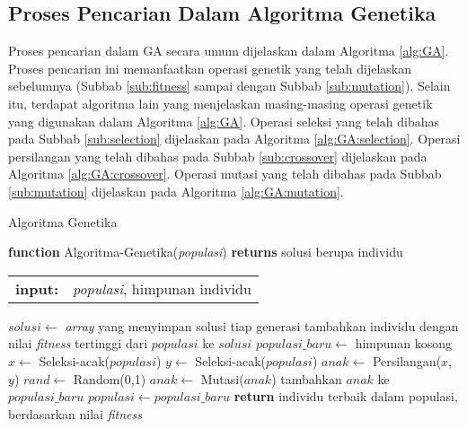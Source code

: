 \subsection{Proses Pencarian Dalam Algoritma Genetika}
Proses pencarian dalam GA secara umum dijelaskan dalam Algoritma \ref{alg:GA}. Proses pencarian ini memanfaatkan operasi genetik yang telah dijelaskan sebelumnya (Subbab \ref{sub:fitness} sampai dengan Subbab \ref{sub:mutation}). Selain itu, terdapat algoritma lain yang menjelaskan masing-masing operasi genetik yang digunakan dalam Algoritma \ref{alg:GA}. Operasi seleksi yang telah dibahas pada Subbab \ref{sub:selection} dijelaskan pada Algoritma \ref{alg:GA:selection}. Operasi persilangan yang telah dibahas pada Subbab \ref{sub:crossover} dijelaskan pada Algoritma \ref{alg:GA:crossover}. Operasi mutasi yang telah dibahas pada Subbab \ref{sub:mutation} dijelaskan pada Algoritma \ref{alg:GA:mutation}.

\begin{algorithm}[H]
	\caption{Algoritma Genetika \cite{russell2016artificial}}
	\label{alg:GA}
	\begin{flushleft}
		\textbf{function} Algoritma-Genetika(\textit{populasi}) \textbf{returns} solusi berupa individu
		\begin{flushleft}
			\begin{tabular}{ l l }
  				\textbf{input:} & \textit{populasi}, himpunan individu
			\end{tabular}
			\hspace{5pt}  
		\end{flushleft}
	\end{flushleft}
	\begin{algorithmic}[1]
		\STATE $solusi \leftarrow$ \textit{array} yang menyimpan solusi tiap generasi \label{alg:GA:ln-1}
		\REPEAT \label{alg:GA:ln-2}
			\STATE tambahkan individu dengan nilai \textit{fitness} tertinggi dari $populasi$ ke $solusi$ \label{alg:GA:ln-3}
			\STATE $populasi\_baru \leftarrow$ himpunan kosong \label{alg:GA:ln-4}
			 \label{alg:GA:ln-5}
				\STATE $x \leftarrow$ Seleksi-acak($populasi$) \label{alg:GA:ln-6}
				\STATE $y \leftarrow$ Seleksi-acak($populasi$) \label{alg:GA:ln-7}
				\STATE $anak \leftarrow$ Persilangan($x$, $y$) \label{alg:GA:ln-8}
				\STATE $rand \leftarrow$ Random(0,1) \label{alg:GA:ln-9}
				 \label{alg:GA:ln-10}
					\STATE $anak \leftarrow$ Mutasi($anak$) \label{alg:GA:ln-11}
				\ENDIF \label{alg:GA:ln-12}
				\STATE tambahkan $anak$ ke $populasi\_baru$ \label{alg:GA:ln-13}
			\ENDFOR \label{alg:GA:ln-14}
			\STATE $populasi \leftarrow populasi\_baru$ \label{alg:GA:ln-15}
		 \label{alg:GA:ln-16}
		\STATE \textbf{return} individu terbaik dalam populasi, berdasarkan nilai \textit{fitness} \label{alg:GA:ln-17}
	\end{algorithmic}
\end{algorithm}


